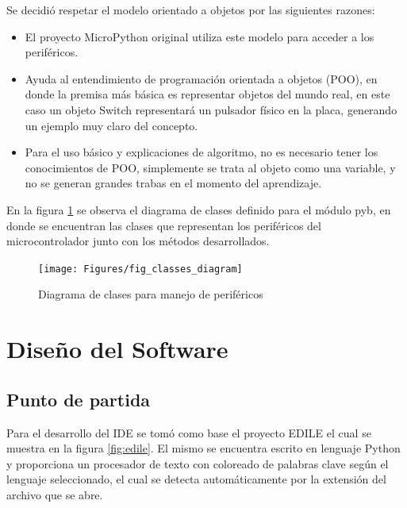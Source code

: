 Se decidió respetar el modelo orientado a objetos por las siguientes razones:

\begin{itemize}
	\item El proyecto MicroPython original utiliza este modelo para acceder a los periféricos.
	\item Ayuda al entendimiento de programación orientada a objetos (POO), en donde la premisa más básica es representar objetos del mundo real, en este caso un objeto Switch representará un pulsador físico en la placa, generando un ejemplo muy claro del concepto.
	\item Para el uso básico y explicaciones de algoritmo, no es necesario tener los conocimientos de POO, simplemente se trata al objeto como una variable, y no se generan grandes trabas en el momento del aprendizaje.
\end{itemize}

En la figura \ref{fig:classes} se observa el diagrama de clases definido para el módulo pyb, en donde se encuentran las clases que representan los periféricos del microcontrolador junto con los métodos desarrollados.

\begin{figure}[ht]
  \centering
    \texttt{[image: Figures/fig\_classes\_diagram]}
  \caption{Diagrama de clases para manejo de periféricos}
  \label{fig:classes}
\end{figure}

\section{Diseño del Software}

\subsection{Punto de partida} 

Para el desarrollo del IDE se tomó como base el proyecto EDILE \cite{edile} el cual se muestra en la figura \ref{fig:edile}. El mismo se encuentra escrito en lenguaje Python y proporciona un procesador de texto con coloreado de palabras clave según el lenguaje seleccionado, el cual se detecta automáticamente por la extensión del archivo que se abre.

